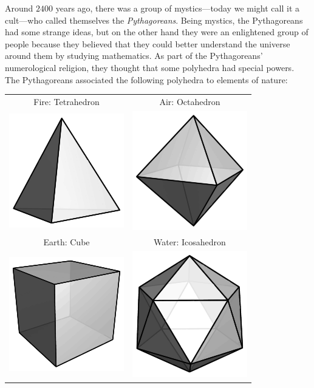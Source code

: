 \documentclass[noauthor,nooutcomes,hints,handout]{ximera}
\begin{document}
Around $2400$ years ago, there was a group of mystics---today we might
call it a cult---who called themselves the
\textit{Pythagoreans}. Being
mystics, the Pythagoreans had some strange ideas, but on the other
hand they were an enlightened group of people because they believed
that they could better understand the universe around them by studying
mathematics. As part of the Pythagoreans' numerological religion, they
thought that some polyhedra had special powers. The Pythagoreans
associated the following polyhedra to elements of nature:
\begin{center}
\begin{tabular}{|c|c|}
\hline
Fire: Tetrahedron & Air: Octahedron \\
\includegraphics{tetrahedron.pdf} 
& \includegraphics{octahedron.pdf} 
\\
\hline 
 Earth: Cube & Water: Icosahedron \\
\includegraphics{cube.pdf} 
& \includegraphics{icosahedron.pdf}  
\\
\hline
\end{tabular}
\end{center}
\end{document}
